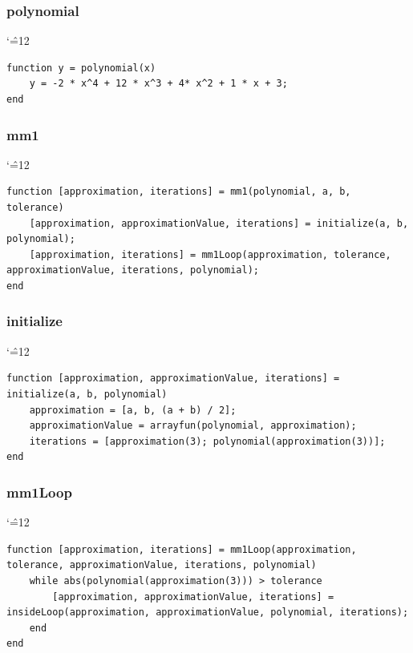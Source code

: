 \documentclass[12pt]{report}
\newenvironment{simplechar}{%
   \catcode`\^=12
}{}
\begin{document}
\subsubsection{polynomial}
\begin{simplechar}
\begin{lstlisting}
function y = polynomial(x)
    y = -2 * x^4 + 12 * x^3 + 4* x^2 + 1 * x + 3;
end
\end{lstlisting}
\end{simplechar}

\subsubsection{mm1}
\begin{simplechar}
\begin{lstlisting}
function [approximation, iterations] = mm1(polynomial, a, b, tolerance)
    [approximation, approximationValue, iterations] = initialize(a, b, polynomial);
    [approximation, iterations] = mm1Loop(approximation, tolerance, approximationValue, iterations, polynomial);
end
\end{lstlisting}
\end{simplechar}

\newpage
\subsubsection{initialize}
\begin{simplechar}
\begin{lstlisting}
function [approximation, approximationValue, iterations] = initialize(a, b, polynomial)
    approximation = [a, b, (a + b) / 2];
    approximationValue = arrayfun(polynomial, approximation);
    iterations = [approximation(3); polynomial(approximation(3))];
end
\end{lstlisting}
\end{simplechar}

\subsubsection{mm1Loop}
\begin{simplechar}
\begin{lstlisting}
function [approximation, iterations] = mm1Loop(approximation, tolerance, approximationValue, iterations, polynomial)
    while abs(polynomial(approximation(3))) > tolerance
        [approximation, approximationValue, iterations] = insideLoop(approximation, approximationValue, polynomial, iterations);
    end
end
\end{lstlisting}
\end{simplechar}
\end{document}
